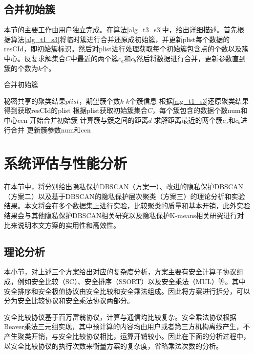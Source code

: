 \subsection{合并初始簇}
本节的主要工作由用户独立完成。在算法\ref{alg_t3_s3}中，给出详细描述。首先根据算法\ref{alg_t1_s3}将临时簇进行合并还原成初始簇，并更新plist每个数据的resCId，即初始簇标识。然后对plist进行处理获取每个初始簇包含点的个数以及簇中心。反复求解集合$ C $中最近的两个簇$ c_a $和$ c_b $然后将数据进行合并，更新参数直到簇的个数为$ k $个。
\begin{algorithm}[htbp]
	\renewcommand{\algorithmicrequire}{\textbf{输入:}}
	\renewcommand{\algorithmicensure}{\textbf{输出:}}
	\caption{合并初始簇}
	\label{alg_t3_s3}
	\begin{algorithmic}[1]
		\REQUIRE 秘密共享的聚类结果$plist$，期望簇个数$k$
		\ENSURE $k$个簇信息
		\STATE 根据\ref{alg_t1_s3}还原聚类结果得到获取resCId的plist
		\STATE 根据plist获取初始簇集合$ C $，每个簇包含的数据个数num和中心cen
		\STATE 开始合并初始簇
		\STATE 计算簇与簇之间的距离$d$
		\STATE 求解距离最近的两个簇$c_a$和$c_b$进行合并
		\STATE 更新簇参数num和cen
		\ENDWHILE
	\end{algorithmic}
\end{algorithm}
\section{系统评估与性能分析}
\label{s4-shiyan}
在本节中，将分别给出隐私保护DBSCAN（方案一）、改进的隐私保护DBSCAN（方案二）以及基于DBSCAN的隐私保护层次聚类（方案三）的理论分析和实验结果。本文将会在多个数据集上进行实验，比较聚类的质量和基本开销，此外实验结果会与其他隐私保护DBSCAN相关研究\cite{bozdemir2021privacy}以及隐私保护K-means相关研究\cite{mohassel2019practical}进行对比来说明本文方案的实用性和高效性。

\subsection{理论分析}
本小节，对上述三个方案给出对应的复杂度分析，方案主要有安全计算子协议组成，例如安全比较（SC）、安全排序（SSORT）以及安全乘法（MUL）等。其中安全排序和安全极值协议由安全比较和安全乘法组成。因此将方案进行拆分，可以分为安全比较协议和安全乘法协议两部分。

安全比较协议基于百万富翁协议\cite{rathee2020cryptflow2}，计算与通信均比较复杂。安全乘法协议根据Beaver乘法三元组\cite{beaver1992efficient}实现，其中预计算的内容均由用户或者第三方机构离线产生，不产生聚类开销，与安全比较协议相比，运算开销较小。因此在下面的分析过程中，以安全比较协议的执行次数来衡量方案的复杂度，省略乘法次数的分析。

